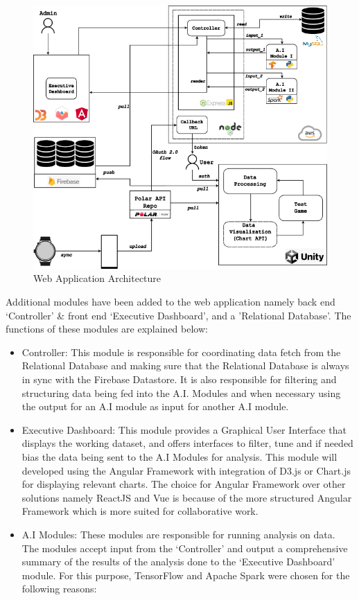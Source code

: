 \documentclass{report}
\begin{document}
\begin{figure}[h]
    \centering
    \includegraphics[scale=0.68]{images/new-arch.png}
    \caption{Web Application Architecture}
    \label{fig:proposed_web_architecture}
\end{figure}


Additional modules have been added to the web application namely back end `Controller' \& front end `Executive Dashboard', and a 'Relational Database'. The functions of these modules are explained below:

\begin{itemize}
\item {Controller}: This module is responsible for coordinating data fetch from the Relational Database and making sure that the Relational Database is always in sync with the Firebase Datastore. It is also responsible for filtering and structuring data being fed into the A.I. Modules and when necessary using the output for an A.I module as input for another A.I module. 
\item{Executive Dashboard}: This module provides a Graphical User Interface that displays the working dataset, and offers interfaces to filter, tune and if needed bias the data being sent to the A.I Modules for analysis. This module will developed using the Angular Framework with integration of D3.js or Chart.js for displaying relevant charts. The choice for Angular Framework over other solutions namely ReactJS and Vue is because of the more structured Angular Framework which is more suited for collaborative work.
\item{A.I Modules}: These modules are responsible for running analysis on data. The modules accept input from the `Controller' and output a comprehensive summary of the results of the analysis done to the `Executive Dashboard' module. For this purpose, TensorFlow and Apache Spark were chosen for the following reasons:
\end{itemize}
\end{document}
